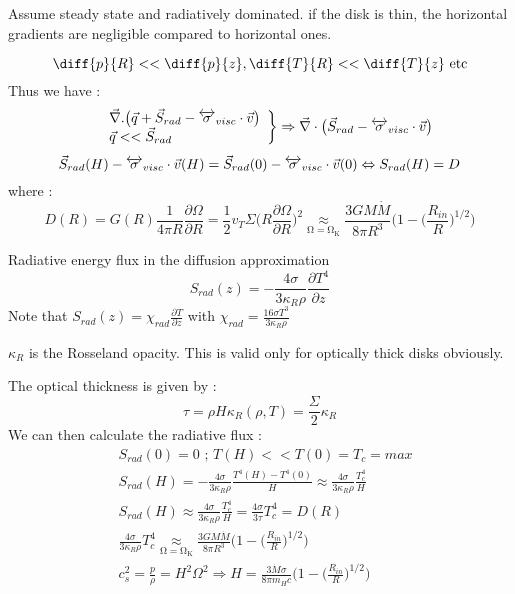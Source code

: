 \documentclass[10pt,a4paper,english,draft]{article}
\let\originalleft\left
\let\originalright\right
\renewcommand{\left}{\mathopen{}\mathclose\bgroup\originalleft}
\renewcommand{\right}{\aftergroup\egroup\originalright}
\begin{document}
Assume steady state and radiatively dominated. if the disk is thin, the horizontal gradients
are negligible compared to horizontal ones.

\begin{equation}	
\diff{p}{R} << \diff{p}{z}, \diff{T}{R} << \diff{T}{z}\text{  etc}
\end{equation}
Thus we have : 
\begin{equation}
 \left.
    \begin{array}{ll}
        & \vec{\nabla}.\big( \vec{q}+\vec{S}_{rad}-\tens{\sigma}_{visc}\cdot\vec{v}\big)\\
        & \vec{q} << \vec{S}_{rad}
    \end{array}
\right \}\Rightarrow \vec{\nabla}\cdot\big(\vec{S}_{rad}-\tens{\sigma}_{visc}\cdot\vec{v}\big) 
\end{equation}
\begin{equation}
\vec{S}_{rad}(H) - \overleftrightarrow{\sigma}_{visc}\cdot\vec{v}(H) = \vec{S}_{rad}(0) - \overleftrightarrow{\sigma}_{visc}\cdot\vec{v}(0) \Leftrightarrow
S_{rad}(H) = D
\end{equation}
where : 
\begin{equation}
D(R) = G(R)\frac{1}{4\pi R}\frac{\partial \Omega}{\partial R } = 
\frac{1}{2}v_T \Sigma\bigg(   R\frac{\partial \Omega}{\partial R }\bigg)^2 \underset{\mathrm{\Omega = \Omega_K}}{\approx}
\frac{3GM\dot{M}}{8\pi R^3}\Bigg( 1-\bigg(\frac{R_{in}}{R}\bigg)^{1/2}\Bigg)
\end{equation}

Radiative energy flux in the diffusion approximation 
\begin{equation}
S_{rad}(z) = -\frac{4\sigma}{3\kappa_R \rho}\frac{\partial T^4}{\partial	z}
\end{equation}
Note that $\displaystyle S_{rad}(z) = \chi_{rad} \frac{\partial T }{\partial z } $ with $\displaystyle\chi_{rad} = \frac{16 \sigma T^3}{3\kappa_R \rho}$ 

$\kappa_R$ is the Rosseland opacity. This is valid only for optically thick disks obviously.

The optical thickness is given by : 
\begin{equation}
\tau = \rho H \kappa_R(\rho ,T) = \frac{\Sigma}{2} \kappa_R
\end{equation}
We can then calculate the radiative flux : 
\begin{align}
& S_{rad}(0) = 0 \text{  ;  } T(H)<<T(0) = T_c = max  \\
& S_{rad}(H) = -\frac{4\sigma}{3\kappa_R \rho}\frac{T^4(H)-T^4(0)}{H} 
\approx   \frac{4\sigma}{3\kappa_R \rho}\frac{T^4_c}{H} \\
& S_{rad}(H) \approx  \frac{4\sigma}{3\kappa_R \rho}\frac{T^4_c}{H} =
\frac{4\sigma}{3\tau}T_c^4 = D(R) \\
& \frac{4\sigma}{3\kappa_R \rho}T^4_c\underset{\mathrm{\Omega = \Omega_K}}{\approx}
\frac{3GM\dot{M}}{8\pi R^3}\bigg(  1-\bigg(\frac{R_{in}}{R}\bigg)^{1/2}\bigg) \\
&c_s^2 = \frac{p}{\rho} = H^2\Omega^2 \Rightarrow H = \frac{3\dot{M}\sigma}{8\pi m_H c }
\bigg(  1-\bigg(\frac{R_{in}}{R}\bigg)^{1/2} \bigg)
\end{align}
\end{document}
